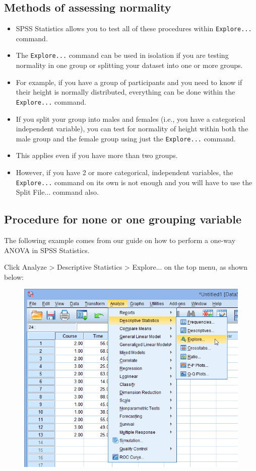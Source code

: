 \documentclass[]{article}
\begin{document}
\subsection{Methods of assessing normality}
\begin{itemize}
	\item SPSS Statistics allows you to test all of these procedures within \texttt{Explore...} command. 
	\item The \texttt{Explore...} command can be used in isolation if you are testing normality in one group or splitting your dataset into one or more groups. 
	\item For example, if you have a group of participants and you need to know if their height is normally distributed, everything can be done within the \texttt{Explore...} command. 
	\item If you split your group into males and females (i.e., you have a categorical independent variable), you can test for normality of height within both the male group and the female group using just the \texttt{Explore...} command. 
	\item This applies even if you have more than two groups. 
	\item However, if you have 2 or more categorical, independent variables, the \texttt{Explore...} command on its own is not enough and you will have to use the Split File... command also.
	
\end{itemize}



\subsection{Procedure for none or one grouping variable}
The following example comes from our guide on how to perform a one-way ANOVA in SPSS Statistics.

Click Analyze > Descriptive Statistics > Explore... on the top menu, as shown below:

\begin{figure}
\centering
\includegraphics[width=0.7\linewidth]{Normality/normality-1}
\caption{}
\label{fig:normality-1}
\end{figure}
\end{document}

